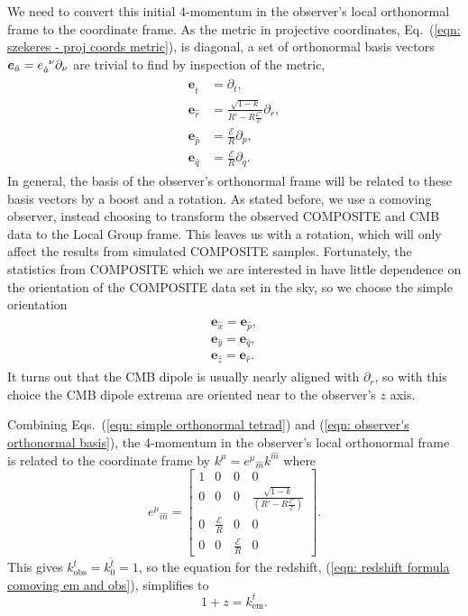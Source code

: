 \documentclass[a4paper,12pt]{report}
\renewcommand{\eqref}[1]{Eq.~({#1})}
\begin{document}
We need to convert this initial 4-momentum in the observer's local orthonormal frame to the coordinate frame. As the metric in projective coordinates, \eqref{\ref{eqn: szekeres - proj coords metric}}, is diagonal, a set of orthonormal basis vectors $\bm{e}_{\hat{a}} = e\indices{_{\hat{a}}^\nu} \partial_\nu$ are trivial to find by inspection of the metric,
\begin{align}
\begin{split}\label{eqn: simple orthonormal tetrad}
  \bm{e}_{\hat{t}} &= \partial_t, \\
  \bm{e}_{\hat{r}} &= \frac{\sqrt{1-k}}{R'-R\frac{\mathcal{E}'}{\mathcal{E}}}\partial_r, \\
  \bm{e}_{\hat{p}} &= \frac{\mathcal{E}}{R}\partial_p, \\
  \bm{e}_{\hat{q}} &= \frac{\mathcal{E}}{R}\partial_q.
\end{split}
\end{align}
In general, the basis of the observer's orthonormal frame will be related to these basis vectors by a boost and a rotation. As stated before, we use a comoving observer, instead choosing to transform the observed COMPOSITE and CMB data to the Local Group frame. This leaves us with a rotation, which will only affect the results from simulated COMPOSITE samples.
Fortunately, the statistics from COMPOSITE which we are interested in have little dependence on the orientation of the COMPOSITE data set in the sky, so we choose the simple orientation
\begin{align}
    \begin{split}\label{eqn: observer's orthonormal basis}
        \bm{e}_{\hat{x}} = \bm{e}_{\hat{p}}, \\
        \bm{e}_{\hat{y}} = \bm{e}_{\hat{q}}, \\
        \bm{e}_{\hat{z}} = \bm{e}_{\hat{r}}.
    \end{split}
\end{align}
It turns out that the CMB dipole is usually nearly aligned with $\partial_r$, so with this choice the CMB dipole extrema are oriented near to the observer's $z$ axis.

Combining Eqs.~(\ref{eqn: simple orthonormal tetrad}) and (\ref{eqn: observer's orthonormal basis}), the 4-momentum in the observer's local orthonormal frame is related to the coordinate frame by $k^\mu = {e^\mu}_{\hat{m}} k^{\hat{m}}$ where
\begin{equation}
    {e^\mu}_{\hat{m}} =
    \begin{bmatrix}
        1 & 0 & 0 & 0 \\
        0 & 0 & 0 & \frac{\sqrt{1-k}}{\left(R'-R\frac{\mathcal{E}'}{\mathcal{E}}\right)} \\
        0 & \frac{\mathcal{E}}{R} & 0 & 0 \\
        0 & 0 & \frac{\mathcal{E}}{R} & 0
    \end{bmatrix}.
\end{equation}
This gives $k^t_{\text{obs}} = k^{\hat{t}}_0 = 1$, so the equation for the redshift, (\ref{eqn: redshift formula comoving em and obs}), simplifies to
\begin{equation}
    1+z = k^t_\text{em}.
\end{equation}
\end{document}
